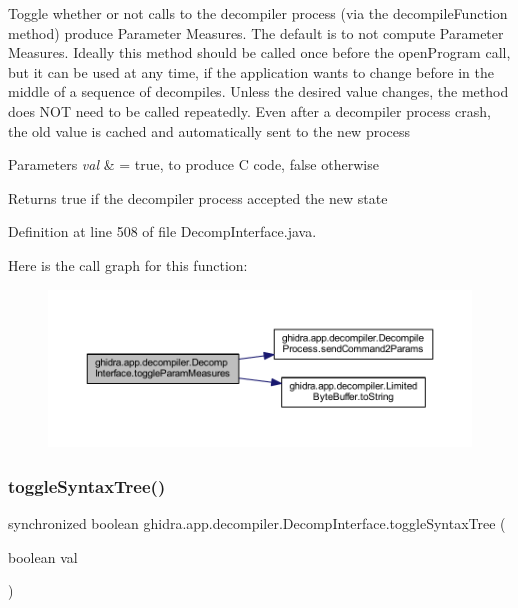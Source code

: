 Toggle whether or not calls to the decompiler process (via the decompile\+Function method) produce Parameter Measures. The default is to not compute Parameter Measures. Ideally this method should be called once before the open\+Program call, but it can be used at any time, if the application wants to change before in the middle of a sequence of decompiles. Unless the desired value changes, the method does N\+OT need to be called repeatedly. Even after a decompiler process crash, the old value is cached and automatically sent to the new process 
\begin{DoxyParams}{Parameters}
{\em val} & = true, to produce C code, false otherwise \\
\hline
\end{DoxyParams}
\begin{DoxyReturn}{Returns}
true if the decompiler process accepted the new state 
\end{DoxyReturn}


Definition at line 508 of file Decomp\+Interface.\+java.

Here is the call graph for this function\+:
\nopagebreak
\begin{figure}[H]
\begin{center}
\leavevmode
\includegraphics[width=350pt]{classghidra_1_1app_1_1decompiler_1_1_decomp_interface_abb67168acc7272f70feac50007c29223_cgraph}
\end{center}
\end{figure}
\mbox{\label{classghidra_1_1app_1_1decompiler_1_1_decomp_interface_ae7b7293b0cbec7e9c71cbbe6f3c8104e}} 
\subsubsection{\texorpdfstring{toggleSyntaxTree()}{toggleSyntaxTree()}}
{\footnotesize\ttfamily synchronized boolean ghidra.\+app.\+decompiler.\+Decomp\+Interface.\+toggle\+Syntax\+Tree (\begin{DoxyParamCaption}\item[{boolean}]{val }\end{DoxyParamCaption})\hspace{0.3cm}{\ttfamily [inline]}}

